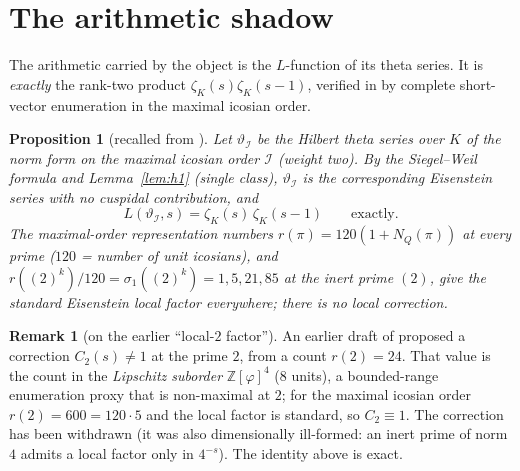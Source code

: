 \documentclass[11pt]{article}
\newtheorem{proposition}[theorem]{Proposition}
\theoremstyle{definition}
\newtheorem{remark}[theorem]{Remark}
\newcommand{\Z}{\mathbb{Z}}
\newcommand{\zetaK}{\zeta_{K}}
\newcommand{\Icos}{\mathcal{I}}
\renewcommand{\Theta}{\vartheta}
\begin{document}
\section{The arithmetic shadow}\label{sec:shadow}
The arithmetic carried by the object is the $L$-function of its theta series. It is
\emph{exactly} the rank-two product $\zetaK(s)\zetaK(s-1)$, verified in
\cite{IcosianTriad} by complete short-vector enumeration in the maximal icosian order.

\begin{proposition}[recalled from \cite{IcosianTriad}]\label{prop:icosian}
Let $\Theta_{\Icos}$ be the Hilbert theta series over $K$ of the norm form on the
maximal icosian order $\Icos$ (weight two). By the Siegel--Weil formula
\cite{Siegel,Weil1965} and Lemma~\ref{lem:h1} (single class), $\Theta_{\Icos}$ is the
corresponding Eisenstein series with no cuspidal contribution, and
\[
   L(\Theta_{\Icos},s)=\zetaK(s)\,\zetaK(s-1)\qquad\text{exactly.}
\]
The maximal-order representation numbers $r(\pi)=120(1+N_Q(\pi))$ at every prime
($120$ = number of unit icosians), and $r((2)^k)/120=\sigma_1((2)^k)=1,5,21,85$ at the
inert prime $(2)$, give the standard Eisenstein local factor everywhere; there is no
local correction.
\end{proposition}
\begin{remark}[on the earlier ``local-$2$ factor'']\label{rem:c2}
An earlier draft of \cite{IcosianTriad} proposed a correction $C_2(s)\ne1$ at the prime
$2$, from a count $r(2)=24$. That value is the count in the \emph{Lipschitz suborder}
$\Z[\varphi]^4$ ($8$ units), a bounded-range enumeration proxy that is non-maximal at
$2$; for the maximal icosian order $r(2)=600=120\cdot5$ and the local factor is
standard, so $C_2\equiv 1$. The correction has been withdrawn (it was also
dimensionally ill-formed: an inert prime of norm $4$ admits a local factor only in
$4^{-s}$). The identity above is exact.
\end{remark}
\end{document}
